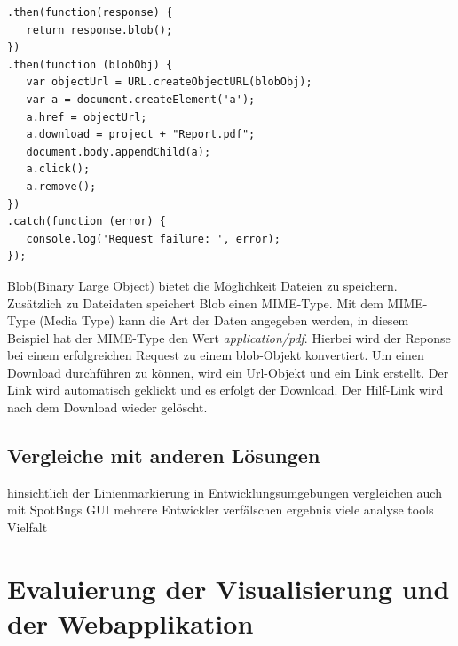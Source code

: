 \begin{samepage}%
	\begin{lstlisting}[float=tbhp]
.then(function(response) {
   return response.blob(); 
})
.then(function (blobObj) {
   var objectUrl = URL.createObjectURL(blobObj);
   var a = document.createElement('a');
   a.href = objectUrl;
   a.download = project + "Report.pdf";
   document.body.appendChild(a);
   a.click();
   a.remove(); 
})
.catch(function (error) {
   console.log('Request failure: ', error);
});
	\end{lstlisting}
\end{samepage}

Blob(Binary Large Object) bietet die Möglichkeit Dateien zu speichern. Zusätzlich zu Dateidaten speichert Blob einen MIME-Type. Mit dem MIME-Type (Media Type) kann die Art der Daten angegeben werden, in diesem Beispiel hat der MIME-Type den Wert \textit{application/pdf}. Hierbei wird der Reponse bei einem erfolgreichen Request zu einem blob-Objekt konvertiert. Um einen Download durchführen zu können, wird ein Url-Objekt und ein Link erstellt. Der Link wird automatisch geklickt und es erfolgt der Download. Der Hilf-Link wird nach dem Download wieder gelöscht.

\subsection{Vergleiche mit anderen Lösungen} 
hinsichtlich der Linienmarkierung in Entwicklungsumgebungen
vergleichen auch mit SpotBugs GUI
mehrere Entwickler verfälschen ergebnis
viele analyse tools Vielfalt
\section{Evaluierung der Visualisierung und der Webapplikation} 